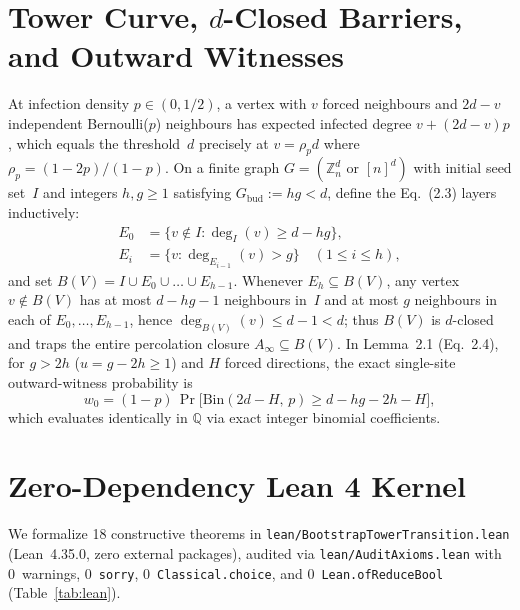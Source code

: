 \documentclass[11pt,twocolumn]{article}
\newcommand{\ZZ}{\mathbb{Z}}
\newcommand{\QQ}{\mathbb{Q}}
\begin{document}
\section{Tower Curve, $d$-Closed Barriers, and Outward Witnesses}\label{sec:prelim}
At infection density $p \in (0, 1/2)$, a vertex with $v$ forced neighbours and $2d-v$ independent Bernoulli($p$) neighbours has expected infected degree $v + (2d-v)p$, which equals the threshold~$d$ precisely at $v = \rho_p d$ where $\rho_p = (1-2p)/(1-p)$. On a finite graph $G=(\ZZ_n^d\text{ or }[n]^d)$ with initial seed set~$I$ and integers $h, g \ge 1$ satisfying $G_{\mathrm{bud}} := hg < d$, define the Eq.~(2.3) layers inductively:
\begin{equation}
\begin{aligned}
  E_0 &= \{v \notin I : \deg_I(v) \ge d - hg\}, \\
  E_i &= \{v : \deg_{E_{i-1}}(v) > g\} \quad (1 \le i \le h),
\end{aligned}
  \label{eq:barrier}
\end{equation}
and set $B(V) = I \cup E_0 \cup \dots \cup E_{h-1}$. Whenever $E_h \subseteq B(V)$, any vertex $v \notin B(V)$ has at most $d-hg-1$ neighbours in~$I$ and at most $g$ neighbours in each of $E_0,\dots,E_{h-1}$, hence $\deg_{B(V)}(v) \le d-1 < d$; thus $B(V)$ is $d$-closed and traps the entire percolation closure $A_\infty \subseteq B(V)$. In Lemma~2.1 (Eq.~2.4), for $g > 2h$ ($u = g-2h \ge 1$) and $H$ forced directions, the exact single-site outward-witness probability is
\begin{equation}
  w_0 = (1-p)\,\Pr\!\bigl[\mathrm{Bin}(2d-H,\, p) \ge d - hg - 2h - H\bigr],
  \label{eq:w0}
\end{equation}
which evaluates identically in $\QQ$ via exact integer binomial coefficients.

\section{Zero-Dependency Lean 4 Kernel}\label{sec:lean}
We formalize 18 constructive theorems in \texttt{lean/BootstrapTowerTransition.lean} (Lean~4.35.0, zero external packages), audited via \texttt{lean/AuditAxioms.lean} with 0~warnings, 0~\texttt{sorry}, 0~\texttt{Classical.choice}, and 0~\texttt{Lean.ofReduceBool} (Table~\ref{tab:lean}).
\end{document}
